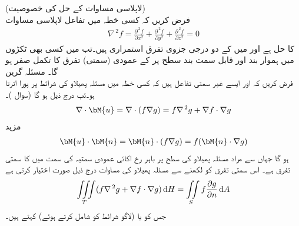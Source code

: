 \quad (لاپلاسی مساوات کے حل کی خصوصیت)\\
فرض کریں کہ کسی خطہ  میں تفاعل  لاپلاسی مساوات
\begin{align*}
\nabla^{\,2}f=\frac{\partial^{\,2} f}{\partial x^2}+\frac{\partial^{\,2} f}{\partial y^2}+\frac{\partial^{\,2} f}{\partial z^2}=0
\end{align*}
کا حل ہے اور  میں  کے دو درجی جزوی تفرق استمراری ہیں۔تب  میں کسی بھی ٹکڑوں میں ہموار  بند اور قابل سمت بند سطح  پر  کے عمودی  (سمتی) تفرق کا تکمل صفر ہو گا۔
\quad مسئلہ گرین\\
فرض کریں کہ  اور  ایسے غیر سمتی تفاعل ہیں کہ کسی خطہ  میں  مسئلہ پھیلاو کی شرائط پر پورا اترتا ہو۔تب درج ذیل ہو گا (سوال )۔
\begin{align*}
\nabla \cdot \bM{u}=\nabla \cdot(f\nabla g)=f\nabla^{\,2}g+\nabla f \cdot \nabla g
\end{align*}
مزید
\begin{align*}
\bM{u}\cdot \bM{n}=\bM{n}\cdot(f\nabla g)=f(\bM{n}\cdot \nabla g)
\end{align*}
ہو گا جہاں  سے مراد مسئلہ پھیلاو کی سطح  پر باہر رخ اکائی عمودی سمتیہ  کی سمت میں  کا سمتی تفرق ہے۔ اس سمتی تفرق کو  لکھنے سے مسئلہ پھیلاو کی مساوات درج ذیل صورت اختیار کرتی ہے
\begin{align}\label{مساوات_خطی_تکمل_گرین_کلیہ_اول}
\iiint\limits_T (f\nabla^{\,2}g+\nabla f\cdot \nabla g)\dif H=\iint\limits_S f\frac{\partial g}{\partial n}\dif A
\end{align}
جس کو   یا (لاگو شرائط کو شامل کرتے ہوئے)  کہتے ہیں۔

